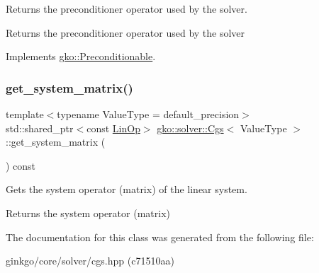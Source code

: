 Returns the preconditioner operator used by the solver. 

\begin{DoxyReturn}{Returns}
the preconditioner operator used by the solver 
\end{DoxyReturn}


Implements \hyperlink{classgko_1_1Preconditionable_ad9545089aef0dfc83bc7a74e5bf1d748}{gko\+::\+Preconditionable}.

\mbox{\label{classgko_1_1solver_1_1Cgs_aa537b2e6b7ccf95e96b4100866da1770}} 
\subsubsection{\texorpdfstring{get\+\_\+system\+\_\+matrix()}{get\_system\_matrix()}}
{\footnotesize\ttfamily template$<$typename Value\+Type  = default\+\_\+precision$>$ \\
std\+::shared\+\_\+ptr$<$const \hyperlink{classgko_1_1LinOp}{Lin\+Op}$>$ \hyperlink{classgko_1_1solver_1_1Cgs}{gko\+::solver\+::\+Cgs}$<$ Value\+Type $>$\+::get\+\_\+system\+\_\+matrix (\begin{DoxyParamCaption}{ }\end{DoxyParamCaption}) const\hspace{0.3cm}{\ttfamily [inline]}}



Gets the system operator (matrix) of the linear system. 

\begin{DoxyReturn}{Returns}
the system operator (matrix) 
\end{DoxyReturn}


The documentation for this class was generated from the following file\+:\begin{DoxyCompactItemize}
\item 
ginkgo/core/solver/cgs.\+hpp (c71510aa)\end{DoxyCompactItemize}
